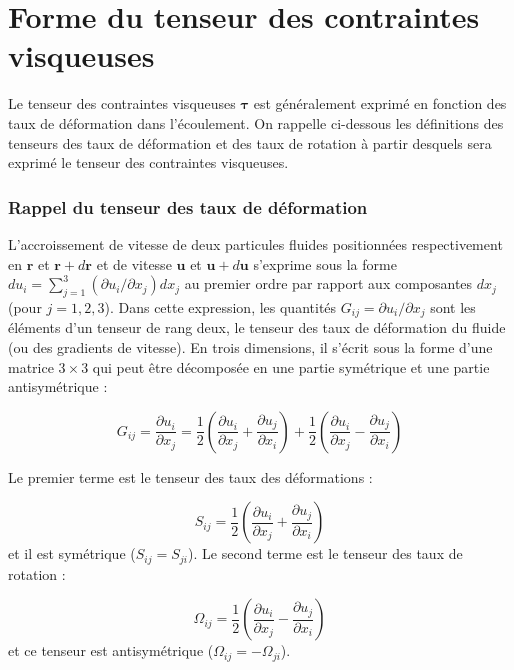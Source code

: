 \chapter{Forme du tenseur des contraintes visqueuses}
Le tenseur des contraintes visqueuses $\mathbf{\tau}$ est g\'en\'eralement
exprim\'e en fonction des taux de d\'eformation dans l'\'ecoulement. On
rappelle ci-dessous les d\'efinitions des tenseurs des taux de d\'eformation
et des taux de rotation \`a partir desquels sera exprim\'e le tenseur
des contraintes visqueuses.


\subsection*{Rappel du tenseur des taux de d\'eformation}

L'accroissement de vitesse de deux particules fluides positionn\'ees
respectivement en $\mathbf{r}$ et $\mathbf{r}+d\mathbf{r}$ et de
vitesse $\mathbf{u}$ et $\mathbf{u}+d\mathbf{u}$ s'exprime sous
la forme $du_{i}=\sum_{j=1}^{3}(\partial u_{i}/\partial x_{j})dx_{j}$
au premier ordre par rapport aux composantes $dx_{j}$ (pour $j=1,2,3$).
Dans cette expression, les quantit\'es $G_{ij}=\partial u_{i}/\partial x_{j}$
sont les \'el\'ements d'un tenseur de rang deux, le tenseur des taux de
d\'eformation du fluide (ou des gradients de vitesse). En trois dimensions,
il s'\'ecrit sous la forme d'une matrice $3\times3$ qui peut \^etre d\'ecompos\'ee
en une partie sym\'etrique et une partie antisym\'etrique :

\begin{equation}
G_{ij}=\frac{\partial u_{i}}{\partial x_{j}}=\frac{1}{2}\left(\frac{\partial u_{i}}{\partial x_{j}}+\frac{\partial u_{j}}{\partial x_{i}}\right)+\frac{1}{2}\left(\frac{\partial u_{i}}{\partial x_{j}}-\frac{\partial u_{j}}{\partial x_{i}}\right)\label{eq:TauxDeformation}
\end{equation}


Le premier terme est le tenseur des taux des d\'eformations :

\begin{equation}
S_{ij}=\frac{1}{2}\left(\frac{\partial u_{i}}{\partial x_{j}}+\frac{\partial u_{j}}{\partial x_{i}}\right)\label{eq:TenseurDeformations}
\end{equation}
et il est sym\'etrique ($S_{ij}=S_{ji}$). Le second terme est le tenseur
des taux de rotation :

\begin{equation}
\Omega_{ij}=\frac{1}{2}\left(\frac{\partial u_{i}}{\partial x_{j}}-\frac{\partial u_{j}}{\partial x_{i}}\right)\label{eq:TenseurRotations}
\end{equation}
et ce tenseur est antisym\'etrique ($\Omega_{ij}=-\Omega_{ji}$).


